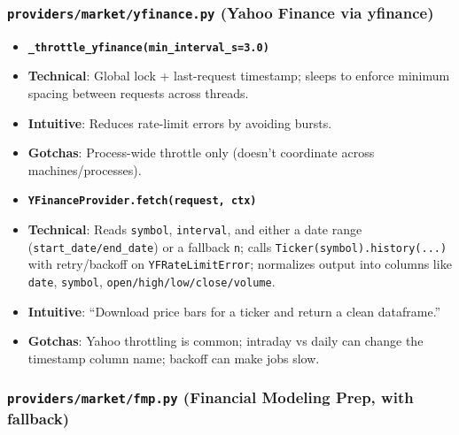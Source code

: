 \documentclass[11pt]{article}
\begin{document}
\subsubsection{\texttt{providers/market/yfinance.py} (Yahoo Finance via yfinance)}

\begin{itemize}[leftmargin=*,nosep]
\item \textbf{\texttt{\_throttle\_yfinance(min\_interval\_s=3.0)}}
\item \textbf{Technical}: Global lock + last-request timestamp; sleeps to enforce minimum spacing between requests across threads.
\item \textbf{Intuitive}: Reduces rate-limit errors by avoiding bursts.
\item \textbf{Gotchas}: Process-wide throttle only (doesn’t coordinate across machines/processes).
\item \textbf{\texttt{YFinanceProvider.fetch(request, ctx)}}
\item \textbf{Technical}: Reads \texttt{symbol}, \texttt{interval}, and either a date range (\texttt{start\_date/end\_date}) or a fallback \texttt{n}; calls \texttt{Ticker(symbol).history(...)} with retry/backoff on \texttt{YFRateLimitError}; normalizes output into columns like \texttt{date}, \texttt{symbol}, \texttt{open/high/low/close/volume}.
\item \textbf{Intuitive}: “Download price bars for a ticker and return a clean dataframe.”
\item \textbf{Gotchas}: Yahoo throttling is common; intraday vs daily can change the timestamp column name; backoff can make jobs slow.
\end{itemize}


\subsubsection{\texttt{providers/market/fmp.py} (Financial Modeling Prep, with fallback)}
\end{document}
